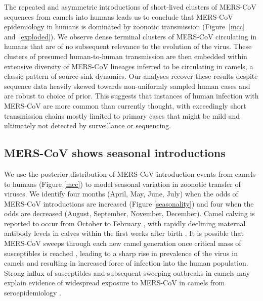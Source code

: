 \documentclass[11pt,oneside,letterpaper]{article}
\begin{document}
The repeated and asymmetric introductions of short-lived clusters of MERS-CoV sequences from camels into humans leads us to conclude that MERS-CoV epidemiology in humans is dominated by zoonotic transmission (Figure~\ref{mcc} and~\ref{exploded}).
We observe dense terminal clusters of MERS-CoV circulating in humans that are of no subsequent relevance to the evolution of the virus.
These clusters of presumed human-to-human transmission are then embedded within extensive diversity of MERS-CoV lineages inferred to be circulating in camels, a classic pattern of source-sink dynamics.
Our analyses recover these results despite sequence data heavily skewed towards non-uniformly sampled human cases and are robust to choice of prior.
This suggests that instances of human infection with MERS-CoV are more common than currently thought, with exceedingly short transmission chains mostly limited to primary cases that might be mild and ultimately not detected by surveillance or sequencing.



\subsection*{MERS-CoV shows seasonal introductions}
We use the posterior distribution of MERS-CoV introduction events from camels to humans (Figure \ref{mcc}) to model seasonal variation in zoonotic transfer of viruses.
We identify four months (April, May, June, July) when the odds of MERS-CoV introductions are increased (Figure \ref{seasonality}) and four when the odds are decreased (August, September, November, December).
Camel calving is reported to occur from October to February \citep{almutairi_non-genetic_2010}, with rapidly declining maternal antibody levels in calves within the first weeks after birth \citep{wernery_camelid_2001}.
It is possible that MERS-CoV sweeps through each new camel generation once critical mass of susceptibles is reached \citep{martinez_seasonality_2014}, leading to a sharp rise in prevalence of the virus in camels and resulting in increased force of infection into the human population.
Strong influx of susceptibles and subsequent sweeping outbreaks in camels may explain evidence of widespread exposure to MERS-CoV in camels from seroepidemiology \citep{muller_2014,corman_antibodies_2014,chu_2014,reusken_2013,reusken_2014}.
\end{document}

